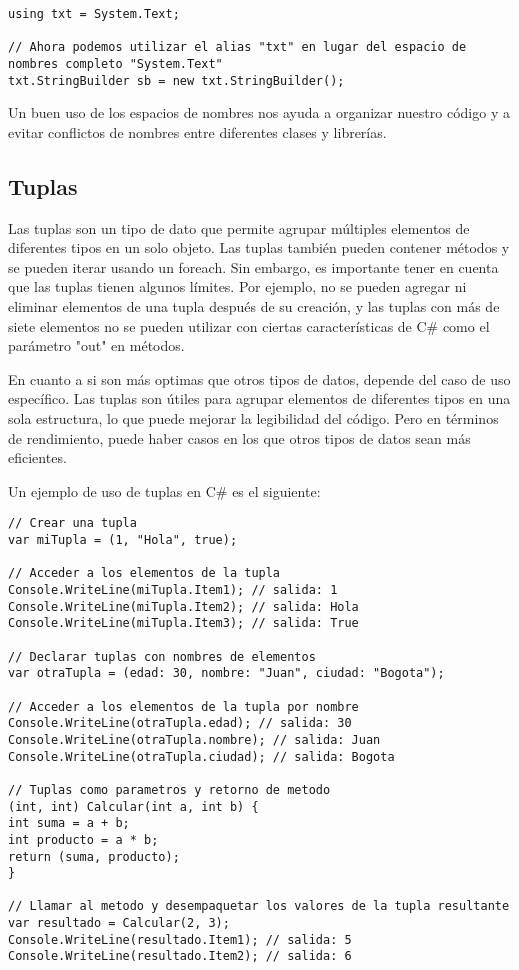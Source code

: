\documentclass[executivepaper]{article}
\begin{document}
\begin{lstlisting}
using txt = System.Text;

// Ahora podemos utilizar el alias "txt" en lugar del espacio de nombres completo "System.Text"
txt.StringBuilder sb = new txt.StringBuilder();
\end{lstlisting}

Un buen uso de los espacios de nombres nos ayuda a organizar nuestro código y a evitar conflictos de nombres entre diferentes clases y librerías.

\subsection{Tuplas}

Las tuplas son un tipo de dato que permite agrupar múltiples elementos de diferentes tipos en un solo objeto. Las tuplas también pueden contener métodos y se pueden iterar usando un foreach. Sin embargo, es importante tener en cuenta que las tuplas tienen algunos límites. Por ejemplo, no se pueden agregar ni eliminar elementos de una tupla después de su creación, y las tuplas con más de siete elementos no se pueden utilizar con ciertas características de C\# como el parámetro "out" en métodos.

En cuanto a si son más optimas que otros tipos de datos, depende del caso de uso específico. Las tuplas son útiles para agrupar elementos de diferentes tipos en una sola estructura, lo que puede mejorar la legibilidad del código. Pero en términos de rendimiento, puede haber casos en los que otros tipos de datos sean más eficientes.

Un ejemplo de uso de tuplas en C\# es el siguiente:

\begin{lstlisting}
// Crear una tupla
var miTupla = (1, "Hola", true);

// Acceder a los elementos de la tupla
Console.WriteLine(miTupla.Item1); // salida: 1
Console.WriteLine(miTupla.Item2); // salida: Hola
Console.WriteLine(miTupla.Item3); // salida: True

// Declarar tuplas con nombres de elementos
var otraTupla = (edad: 30, nombre: "Juan", ciudad: "Bogota");

// Acceder a los elementos de la tupla por nombre
Console.WriteLine(otraTupla.edad); // salida: 30
Console.WriteLine(otraTupla.nombre); // salida: Juan
Console.WriteLine(otraTupla.ciudad); // salida: Bogota

// Tuplas como parametros y retorno de metodo
(int, int) Calcular(int a, int b) {
int suma = a + b;
int producto = a * b;
return (suma, producto);
}

// Llamar al metodo y desempaquetar los valores de la tupla resultante
var resultado = Calcular(2, 3);
Console.WriteLine(resultado.Item1); // salida: 5
Console.WriteLine(resultado.Item2); // salida: 6
\end{lstlisting}
\end{document}
